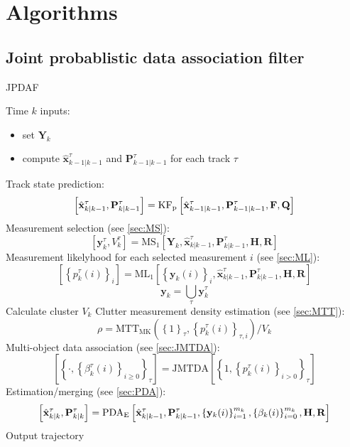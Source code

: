\section{Algorithms}
\subsection{Joint probablistic data association filter}
\begin{algorithm}
    \label{alg:jpdaf}
    \caption{JPDAF}
    \begin{algorithmic}[1]
        \State Time $k$ inputs:
        \begin{itemize}
            \item set $\mathbf Y_k $
            \item compute $\hat{\mathbf x}^\tau_{k-1|k-1}$ and $\mathbf P^\tau_{k-1|k-1}$ for each track $\tau$
        \end{itemize}
        \State Track state prediction:
        $$\left[ \hat{\mathbf x}^\tau_{k|k-1}, \mathbf P^\tau_{k|k-1}\right] = \text{KF}_\text p \left[ \hat{\mathbf x}^\tau_{k-1|k-1},\mathbf P^\tau_{k-1|k-1}, \mathbf F, \mathbf Q\right]$$
        \State Measurement selection (see \ref{sec:MS}):
        $$\left[\mathbf y^\tau_k, V^\tau_k\right] = \text{MS}_1\left[\mathbf Y_k, \hat{\mathbf x}^\tau_{k|k-1}, \mathbf P^\tau_{k|k-1}, \mathbf H, \mathbf R\right]$$
        \State Measurement likelyhood for each selected measurement $i$ (see \ref{sec:ML}):
        $$\left[\left\{ p^\tau_k(i)\right\}_i\right] = \text{ML}_1\left[\left\{\mathbf y_k(i)\right\}_i, \hat{\mathbf x}^\tau_{k|k-1}, \mathbf P^\tau_{k|k-1}, \mathbf H, \mathbf R\right]$$
        \EndFor
        $$\mathbf y_k = \bigcup_\tau \mathbf y^\tau_k$$
        \State Calculate cluster $V_k$ 
        \State Clutter measurement density estimation (see \ref{sec:MTT}):
        $$\rho = \text{MTT}_\text{MK}\left( \left\{ 1 \right\}_\tau, \left\{ p^\tau_k(i) \right\}_{\tau,i}\right)/V_k$$
        \EndIf
        \State Multi-object data association (see \ref{sec:JMTDA}):
        $$\left[\left\{ \cdot , \left\{\beta_k^\tau(i)\right\}_{i\geq 0}\right\}_\tau\right] = \text{JMTDA}\!\left[\left\{ 1, \left\{ p^\tau_k(i)\right\}_{i>0}\right\}_\tau\right]$$
        \EndFor
        \State Estimation/merging (see \ref{sec:PDA}):
        $$\left[\hat{\mathbf x}^\tau_{k|k}, \mathbf P^\tau_{k|k}\right] = \text{PDA}_\text E \left[\hat{\mathbf x}^\tau_{k|k-1}, \mathbf P^\tau_{k|k-1}, \left\{ \mathbf y_k(i)\right\}^{m_k}_{i=1}, \left\{ \mathbf \beta_k(i)\right\}^{m_k}_{i=0}, \mathbf H, \mathbf R\right]$$
        \State Output trajectory
        \EndFor 
    \end{algorithmic}
\end{algorithm}